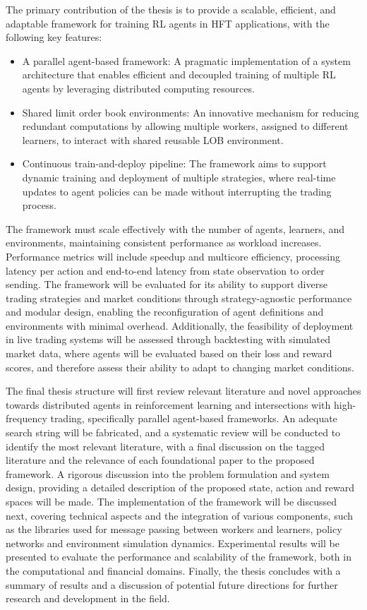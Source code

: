 The primary contribution of the thesis is to provide a scalable, efficient, and adaptable framework for training RL agents in HFT applications, with the following key features:

\begin{itemize}
    \item A parallel agent-based framework: A pragmatic implementation of a system architecture that enables efficient and decoupled training of multiple RL agents
    by leveraging distributed computing resources.

    \item Shared limit order book environments: An innovative mechanism for reducing redundant computations by allowing multiple workers,
    assigned to different learners, to interact with shared reusable LOB environment.

    \item Continuous train-and-deploy pipeline: The framework aims to support dynamic training and deployment of multiple strategies,
    where real-time updates to agent policies can be made without interrupting the trading process.
\end{itemize}

The framework must scale effectively with the number of agents, learners, and environments, maintaining consistent performance as workload increases.
Performance metrics will include speedup and multicore efficiency, processing latency per action and end-to-end latency from state observation to order sending.
The framework will be evaluated for its ability to support diverse trading strategies
and market conditions through strategy-agnostic performance and modular design,
enabling the reconfiguration of agent definitions and environments with minimal overhead.
Additionally, the feasibility of deployment in live trading systems will be assessed through backtesting with simulated market data,
where agents will be evaluated based on their loss and reward scores, and therefore assess their ability to adapt to changing market conditions.

The final thesis structure will first review relevant literature and novel approaches towards distributed agents
in reinforcement learning and intersections with high-frequency trading, specifically parallel agent-based frameworks.
An adequate search string will be fabricated, and a systematic review will be conducted to identify the most relevant literature,
with a final discussion on the tagged literature and the relevance of each foundational paper to the proposed framework.
A rigorous discussion into the problem formulation and system design, providing a detailed description of the proposed state, action and reward spaces will be made.
The implementation of the framework will be discussed next, covering technical aspects and the integration of various components,
such as the libraries used for message passing between workers and learners, policy networks and environment simulation dynamics.
Experimental results will be presented to evaluate the performance and scalability of the framework, both in the computational and financial domains.
Finally, the thesis concludes with a summary of results and a discussion of potential future directions for further research and development in the field.

